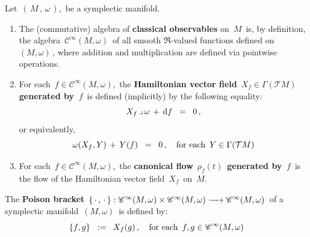 \vskip 0.5cm
\begin{definition}
\mbox{}
\vskip 0.05cm
\noindent
Let
\,$\left(\,M\,,\,\omega\,\right)$,\,
be a symplectic manifold.
\begin{enumerate}
\item
	The (commutative) algebra of \textbf{classical observables} on \,$M$\, is, by definition,
	the algebra \,$\mathscr{C}^{\infty}(M,\omega)$\, of all smooth $\Re$-valued functions
	defined on \,$(M,\omega)$\,,
	where addition and multiplication are defined via pointwise operations.
\item
	For each \,$f \in \mathscr{C}^{\infty}(M,\omega)$,\,
	the \textbf{Hamiltonian vector field} \,$X_{f} \in \Gamma(\mathcal{T}M)$\,
	\textbf{generated by \,$f$\,} is defined (implicitly)
	by the following equality:
	\begin{equation*}
	X_{f} \,\lrcorner\, \omega
	\,+\,
	\textnormal{d} f
	\;\; = \;\;
		0\,,
	\end{equation*}
	or equivalently,
	\begin{equation*}
	\omega(X_{f},Y)
	\,+\,
	Y(f)
	\;\; = \;\;
		0\,,
	\quad
	\textnormal{for each \,$Y \in \Gamma(\mathcal{T}M)$}
	\end{equation*}
\item
	For each \,$f \in \mathscr{C}^{\infty}(M,\omega)$,\,
	the \textbf{canonical flow} \,$\rho_{f}(t)$\, \textbf{generated by \,$f$\,}
	is the flow of the Hamiltonian vector field \,$X_{f}$\, on \,$M$.\,
\end{enumerate}
\end{definition}

\vskip 0.5cm
\begin{definition}
\mbox{}
\vskip 0.05cm
\noindent
The \textbf{Poison bracket}
\,$
\left\{\,\cdot\,,\,\cdot\,\right\} :
\mathscr{C}^{\infty}(M,\omega) \times \mathscr{C}^{\infty}(M,\omega)
\xrightarrow{{\color{white}222}}
\mathscr{C}^{\infty}(M,\omega)
$\,
of a symplectic manifold
\,$\left(M,\omega\right)$\,
is defined by:
\begin{equation*}
\left\{f,g\right\}
\;\; := \;\;
	X_{f}(g)\,,
\quad
\textnormal{for each \,$f, g \in \mathscr{C}^{\infty}(M,\omega)$}
\end{equation*}
\end{definition}

